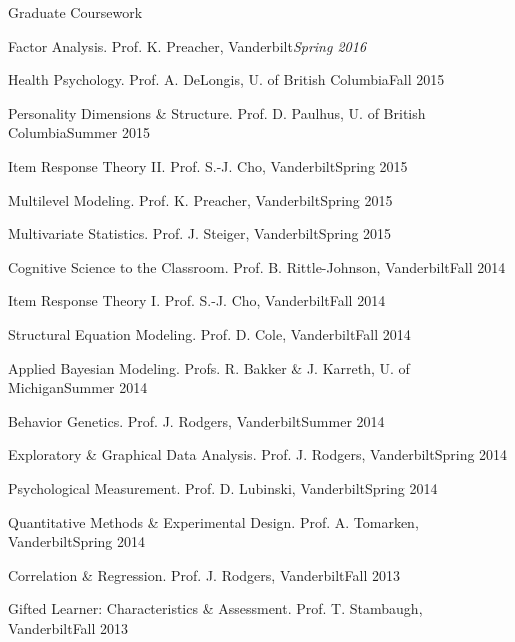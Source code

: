 \documentclass [11pt,letterpaper]{article}
\begin{document}
\begin{rSection}{\textrm{Graduate Coursework}}
\begin{etaremune}
\item Factor Analysis. Prof. K. Preacher, Vanderbilt\hfill{\textit{Spring 2016}}
\item Health Psychology.  Prof. A. DeLongis, U. of British Columbia\hfill  {Fall 2015}
\item Personality Dimensions \& Structure.  Prof. D. Paulhus, U. of British Columbia\hfill  {Summer 2015}
\item Item Response Theory \textrm{II}. Prof. S.-J. Cho, Vanderbilt\hfill  {Spring 2015}
\item Multilevel Modeling. Prof. K. Preacher, Vanderbilt\hfill  {Spring 2015}
\item Multivariate Statistics. Prof. J. Steiger, Vanderbilt\hfill  {Spring 2015}
\item Cognitive Science to the Classroom. Prof. B. Rittle-Johnson, Vanderbilt\hfill  {Fall 2014}
\item Item Response Theory \textrm{I}. Prof. S.-J. Cho, Vanderbilt\hfill  {Fall 2014}
\item Structural Equation Modeling. Prof. D. Cole, Vanderbilt\hfill  {Fall 2014}
\item Applied Bayesian Modeling. Profs. R. Bakker \& J. Karreth, U. of Michigan\hfill  {Summer 2014}
\item Behavior Genetics. Prof. J. Rodgers, Vanderbilt\hfill  {Summer 2014}
\item Exploratory \& Graphical Data Analysis. Prof. J. Rodgers, Vanderbilt\hfill  {Spring 2014}
\item Psychological Measurement. Prof. D. Lubinski, Vanderbilt\hfill  {Spring 2014}
\item Quantitative Methods \& Experimental Design. Prof. A. Tomarken, Vanderbilt\hfill  {Spring 2014}
\item Correlation \& Regression. Prof. J. Rodgers, Vanderbilt\hfill  {Fall 2013}
\item Gifted Learner: Characteristics \& Assessment. Prof. T. Stambaugh, Vanderbilt\hfill  {Fall 2013}

\end{etaremune}
\end{rSection}
\end{document}
